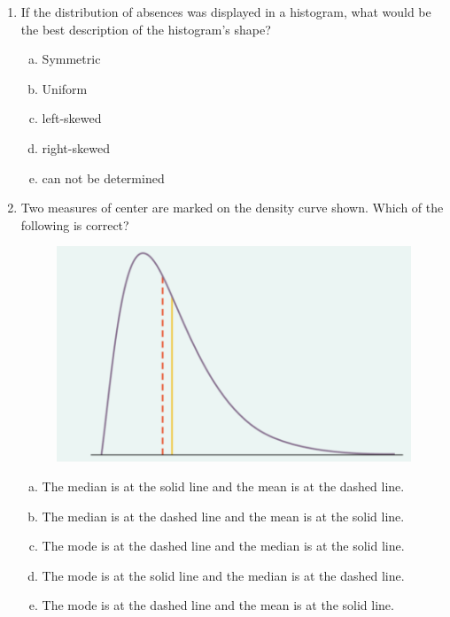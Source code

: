 \documentclass[a4paper,12pt,twoside]{book}
\begin{document}
\begin{itemize}
\begin{enumerate}
        \begin{enumerate}[(a)]
            \item 1 \hspace{0.6cm} (b) 2 \hspace{0.6cm} (c) 3
            \hspace{0.6cm} (d) 5    \hspace{0.6cm} (e) 14
        \end{enumerate}
        
   \item If the distribution of absences was displayed in a histogram, what would be the best description of the histogram’s shape?
   
       \begin{enumerate}[(a)]
       \item Symmetric
       \item Uniform
       \item left-skewed
       \item right-skewed
       \item can not be determined
       \end{enumerate}  
       
       
   \item Two measures of center are marked on the density curve shown. Which of the following is correct?
       \begin{figure}[H]
       \centering
       \includegraphics[scale=0.5]{figure12}
       \end{figure}    
       
       \begin{enumerate}[(a)]
           \item The median is at the solid line and the mean is at the dashed line.
           \item The median is at the dashed line and the mean is at the solid line.
           \item The mode is at the dashed line and the median is at the solid line.
           \item The mode is at the solid line and the median is at the dashed line.
           \item  The mode is at the dashed line and the mean is at the solid line.
       \end{enumerate}   
        

\end{enumerate}
\end{itemize}
\end{document}

